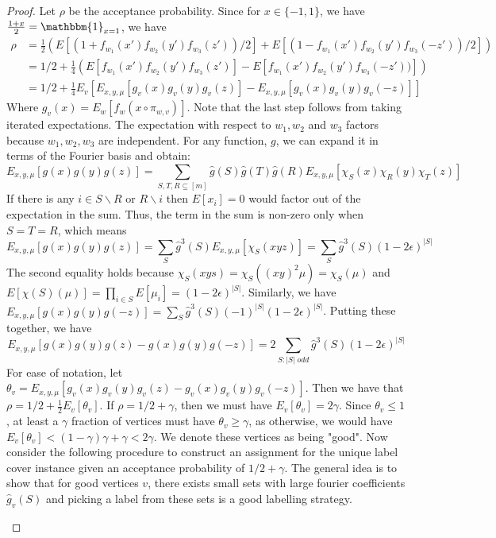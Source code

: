 \documentclass{article}
\newcommand{\1}{\mathbbm{1}}
\begin{document}
\begin{proof}
Let $\rho$ be the acceptance probability. Since for $x\in \{-1,1\}$, we have $\frac{1+x}{2} = \1_{x=1}$, we have
\begin{align*}
    \rho &= \frac{1}{2}(E[(1+f_{w_1}(x')f_{w_2}(y')f_{w_3}(z'))/2] + E[(1-f_{w_1}(x')f_{w_2}(y')f_{w_3}(-z'))/2])\\
    &= 1/2 + \frac{1}{4}(E[f_{w_1}(x')f_{w_2}(y')f_{w_3}(z')]-E[f_{w_1}(x')f_{w_2}(y')f_{w_3}(-z'))])\\
    &= 1/2 + \frac{1}{4}E_v[E_{x,y,\mu}[g_v(x)g_v(y)g_v(z)]-E_{x,y,\mu}[g_v(x)g_v(y)g_v(-z)]]
\end{align*}
Where $g_v(x) = E_w[f_w(x\circ \pi_{w,v})]$. Note that the last step follows from taking iterated expectations. The expectation with respect to $w_1,w_2$ and $w_3$ factors because  $w_1,w_2,w_3$ are independent. For any function, $g$, we can expand it in terms of the Fourier basis and obtain:  $$E_{x,y,\mu}[g(x)g(y)g(z)] = \sum_{S,T,R\subseteq[m]}\hat{g}(S)\hat{g}(T)\hat{g}(R)E_{x,y,\mu}[\chi_S(x)\chi_R(y)\chi_T(z)]$$
If there is any $i\in S\backslash R$ or $R\backslash i$ then $E[x_i] = 0$ would factor out of the expectation in the sum. Thus, the term in the sum is non-zero only when $S=T=R$, which means
$$E_{x,y,\mu}[g(x)g(y)g(z)] = \sum_S\hat{g}^3(S)E_{x,y,\mu}[\chi_S(xyz)] = \sum_S\hat{g}^3(S)(1-2\epsilon)^{|S|}$$
The second equality holds because $\chi_S(xys) = \chi_S((xy)^2\mu) = \chi_S(\mu)$ and $E[\chi(S)(\mu)] = \prod_{i\in S}E[\mu_i] = (1-2\epsilon)^{|S|}$. Similarly, we have $E_{x,y,\mu}[g(x)g(y)g(-z)] = \sum_{S}\hat{g}^3(S)(-1)^{|S|}(1-2\epsilon)^{|S|}$. Putting these together, we have $$E_{x,y,\mu}[g(x)g(y)g(z)-g(x)g(y)g(-z)] = 2\sum_{S:|S|\;odd}\hat{g}^3(S)(1-2\epsilon)^{|S|}$$
For ease of notation, let $\theta_v = E_{x,y,\mu}[g_v(x)g_v(y)g_v(z)-g_v(x)g_v(y)g_v(-z)]$. Then we have that $\rho = 1/2+\frac{1}{2}E_v[\theta_v]$. If $\rho =1/2 + \gamma$, then we must have $E_v[\theta_v] = 2\gamma$. Since $\theta_v\leq 1$, at least a $\gamma$ fraction of vertices must have $\theta_v \geq \gamma$, as otherwise, we would have $E_v[\theta_v] < (1-\gamma)\gamma +\gamma < 2\gamma$. We denote these vertices as being "good". Now consider the following procedure to construct an assignment for the unique label cover instance given an acceptance probability of $1/2+\gamma$. The general idea is to show that for good vertices $v$, there exists small sets with large fourier coefficients $\hat{g}_v(S)$ and picking a label from these sets is a good labelling strategy.
\begin{enumerate}[1)]

\end{enumerate}
\end{proof}
\end{document}
